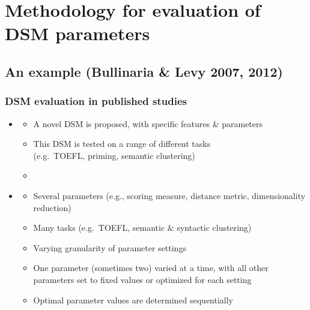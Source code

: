 \documentclass[t]{beamer} %
\begin{document}
\section{Methodology for evaluation of DSM parameters}

\subsection{An example (Bullinaria \& Levy 2007, 2012)}

\begin{frame}
  \frametitle{DSM evaluation in published studies}

  \begin{itemize}
  \item {} \citep{Pado:Lapata:07,Baroni:Lenci:10,Pennington:Socher:Manning:14}
    \begin{itemize}
    \item A novel DSM is proposed, with specific features \& parameters
    \item This DSM is tested on a range of different tasks\\ (e.g.\ TOEFL, priming, semantic clustering)
    \item[]
    \end{itemize}

  \item<2->  \citep{Bullinaria:Levy:07,Bullinaria:Levy:12,Kiela:Clark:14,Polajnar:Clark:14}
    \begin{itemize}
    \item Several parameters (e.g., scoring measure, distance metric, dimensionality reduction) 
    \item Many tasks (e.g.\ TOEFL, semantic \& syntactic clustering)
    \item Varying granularity of parameter settings
    \item One parameter (sometimes two) varied at a time, with all other parameters set to fixed values or optimized for each setting
    \item Optimal parameter values are determined sequentially
    \end{itemize}
  \end{itemize}
\end{frame}
\end{document}
